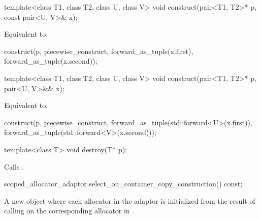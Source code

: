 %
\begin{itemdecl}
template<class T1, class T2, class U, class V>
  void construct(pair<T1, T2>* p, const pair<U, V>& x);
\end{itemdecl}

\begin{itemdescr}
\pnum
\effects Equivalent to:
\begin{codeblock}
construct(p, piecewise_construct,
          forward_as_tuple(x.first),
          forward_as_tuple(x.second));
\end{codeblock}
\end{itemdescr}

%
\begin{itemdecl}
template<class T1, class T2, class U, class V>
  void construct(pair<T1, T2>* p, pair<U, V>&& x);
\end{itemdecl}

\begin{itemdescr}
\pnum
\effects Equivalent to:
\begin{codeblock}
construct(p, piecewise_construct,
          forward_as_tuple(std::forward<U>(x.first)),
          forward_as_tuple(std::forward<V>(x.second)));
\end{codeblock}
\end{itemdescr}

%
\begin{itemdecl}
template<class T>
  void destroy(T* p);
\end{itemdecl}

\begin{itemdescr}
\pnum
\effects Calls .
\end{itemdescr}

%
\begin{itemdecl}
scoped_allocator_adaptor select_on_container_copy_construction() const;
\end{itemdecl}

\begin{itemdescr}
\pnum
\returns A new  object where each allocator  in the
adaptor is initialized from the result of calling
 on the
corresponding allocator in .
\end{itemdescr}

